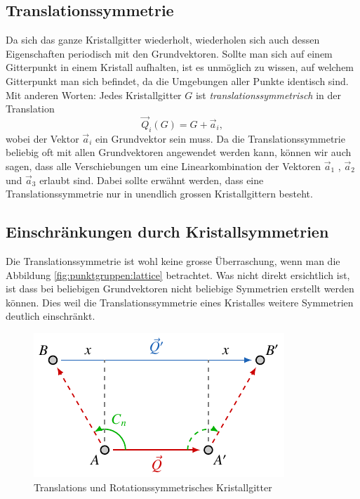 \subsection{Translationssymmetrie} 
%
Da sich das ganze Kristallgitter wiederholt, wiederholen sich auch dessen Eigenschaften periodisch mit den Grundvektoren.
Sollte man sich auf einem Gitterpunkt in einem Kristall aufhalten, ist es unmöglich zu wissen, auf welchem Gitterpunkt man sich befindet, da die Umgebungen aller Punkte identisch sind. 
Mit anderen Worten: Jedes Kristallgitter $ G $ ist \emph{translationssymmetrisch} in der Translation 
\[
    \vec{Q}_i(G) = G + \vec{a}_i,
\]
wobei der Vektor $\vec{a}_i$ ein Grundvektor sein muss.
Da die Translationssymmetrie beliebig oft mit allen Grundvektoren angewendet werden kann, 
können wir auch sagen, dass alle Verschiebungen um eine Linearkombination 
der Vektoren $\vec{a}_1$ , $\vec{a}_2$ und $\vec{a}_3$ erlaubt sind.
Dabei sollte erwähnt werden, dass eine Translationssymmetrie nur in unendlich grossen Kristallgittern besteht.

\subsection{Einschränkungen durch Kristallsymmetrien} \label{sec:punktgruppen:Translationssymmetrie}
 Die Translationssymmetrie ist wohl keine grosse Überraschung, wenn man die Abbildung \ref{fig:punktgruppen:lattice} betrachtet.
 Was nicht direkt ersichtlich ist, ist dass bei beliebigen Grundvektoren nicht beliebige Symmetrien erstellt werden können.
 Dies weil die Translationssymmetrie eines Kristalles weitere Symmetrien deutlich einschränkt.
  
\begin{figure}
    \centering
    \includegraphics[]{papers/punktgruppen/figures/combine-symmetries}
    \caption{
        Translations und Rotationssymmetrisches Kristallgitter
    }
    \label{fig:punktgruppen:rot-geometry}
\end{figure}

